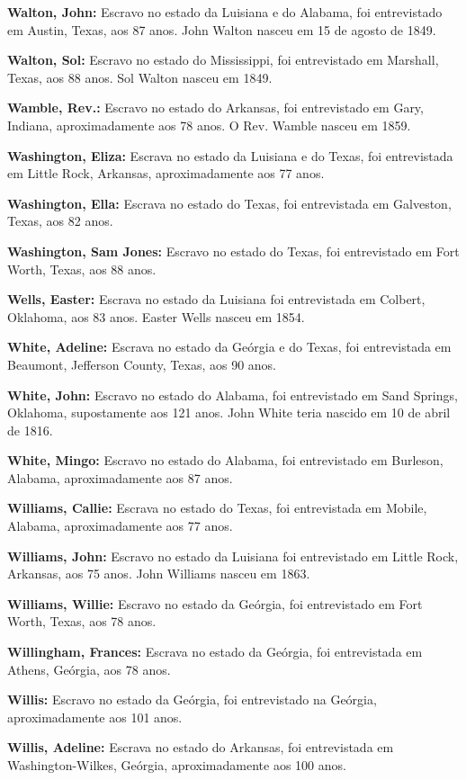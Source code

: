 \textbf{Walton, John:} Escravo no estado da Luisiana e do Alabama, foi
entrevistado em Austin, Texas, aos 87 anos. John Walton nasceu em 15 de
agosto de 1849.

\textbf{Walton, Sol:} Escravo no estado do Mississippi, foi entrevistado
em Marshall, Texas, aos 88 anos. Sol Walton nasceu em 1849.

\textbf{Wamble, Rev.:} Escravo no estado do Arkansas, foi entrevistado
em Gary, Indiana, aproximadamente aos 78 anos. O Rev. Wamble nasceu em
1859.

\textbf{Washington, Eliza:} Escrava no estado da Luisiana e do Texas,
foi entrevistada em Little Rock, Arkansas, aproximadamente aos 77 anos.

\textbf{Washington, Ella:} Escrava no estado do Texas, foi entrevistada
em Galveston, Texas, aos 82 anos.

\textbf{Washington, Sam Jones:} Escravo no estado do Texas, foi
entrevistado em Fort Worth, Texas, aos 88 anos.

\textbf{Wells, Easter:} Escrava no estado da Luisiana foi entrevistada
em Colbert, Oklahoma, aos 83 anos. Easter Wells nasceu em 1854.

\textbf{White, Adeline:} Escrava no estado da Geórgia e do Texas, foi
entrevistada em Beaumont, Jefferson County, Texas, aos 90 anos.

\textbf{White, John:} Escravo no estado do Alabama, foi entrevistado em
Sand Springs, Oklahoma, supostamente aos 121 anos. John White teria
nascido em 10 de abril de 1816.

\textbf{White, Mingo:} Escravo no estado do Alabama, foi entrevistado em
Burleson, Alabama, aproximadamente aos 87 anos.

\textbf{Williams, Callie:} Escrava no estado do Texas, foi entrevistada
em Mobile, Alabama, aproximadamente aos 77 anos.

\textbf{Williams, John:} Escravo no estado da Luisiana foi entrevistado
em Little Rock, Arkansas, aos 75 anos. John Williams nasceu em 1863.

\textbf{Williams, Willie:} Escravo no estado da Geórgia, foi
entrevistado em Fort Worth, Texas, aos 78 anos.

\textbf{Willingham, Frances:} Escrava no estado da Geórgia, foi
entrevistada em Athens, Geórgia, aos 78 anos.

\textbf{Willis:} Escravo no estado da Geórgia, foi entrevistado na
Geórgia, aproximadamente aos 101 anos.

\textbf{Willis, Adeline:} Escrava no estado do Arkansas, foi
entrevistada em Washington-Wilkes, Geórgia, aproximadamente aos 100
anos.

